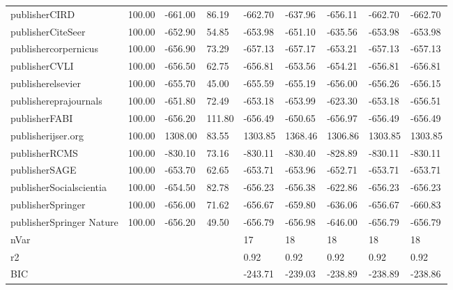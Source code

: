 \documentclass[a4paper, 12pt]{article}
\begin{document}
\begin{table}[H]
{\begin{tabular}{@{}lllllllll@{}}
                publisherCIRD               & 100.00 & -661.00 & 86.19  & -662.70 & -637.96 & -656.11 & -662.70 & -662.70 \\
                publisherCiteSeer           & 100.00 & -652.90 & 54.85  & -653.98 & -651.10 & -635.56 & -653.98 & -653.98 \\
                publishercorpernicus        & 100.00 & -656.90 & 73.29  & -657.13 & -657.17 & -653.21 & -657.13 & -657.13 \\
                publisherCVLI               & 100.00 & -656.50 & 62.75  & -656.81 & -653.56 & -654.21 & -656.81 & -656.81 \\
                publisherelsevier           & 100.00 & -655.70 & 45.00  & -655.59 & -655.19 & -656.00 & -656.26 & -656.15 \\
                publishereprajournals       & 100.00 & -651.80 & 72.49  & -653.18 & -653.99 & -623.30 & -653.18 & -656.51 \\
                publisherFABI               & 100.00 & -656.20 & 111.80 & -656.49 & -650.65 & -656.97 & -656.49 & -656.49 \\
                publisherijser.org          & 100.00 & 1308.00 & 83.55  & 1303.85 & 1368.46 & 1306.86 & 1303.85 & 1303.85 \\
                publisherRCMS               & 100.00 & -830.10 & 73.16  & -830.11 & -830.40 & -828.89 & -830.11 & -830.11 \\
                publisherSAGE               & 100.00 & -653.70 & 62.65  & -653.71 & -653.96 & -652.71 & -653.71 & -653.71 \\
                publisherSocialscientia     & 100.00 & -654.50 & 82.78  & -656.23 & -656.38 & -622.86 & -656.23 & -656.23 \\
                publisherSpringer           & 100.00 & -656.00 & 71.62  & -656.67 & -659.80 & -636.06 & -656.67 & -660.83 \\
                publisherSpringer Nature    & 100.00 & -656.20 & 49.50  & -656.79 & -656.98 & -646.00 & -656.79 & -656.79 \\
                nVar                        &        &         &        & 17      & 18      & 18      & 18      & 18      \\
                r2                          &        &         &        & 0.92    & 0.92    & 0.92    & 0.92    & 0.92    \\
                BIC                         &        &         &        & -243.71 & -239.03 & -238.89 & -238.89 & -238.86 \\

\end{tabular}}
\end{table}
\end{document}
